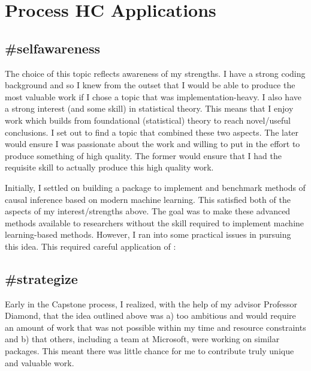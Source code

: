 \documentclass[./main.tex]{subfiles}
\begin{document}

\section{Process HC Applications}
\label{hc:section-process}

\subsection*{\textbf{\#selfawareness}}
\label{hc:selfawareness}

The choice of this topic reflects awareness of my strengths. I have a strong coding background and so I knew from the outset that I would be able to produce the most valuable work if I chose a topic that was implementation-heavy. I also have a strong interest (and some skill) in statistical theory. This means that I enjoy work which builds from foundational (statistical) theory to reach novel/useful conclusions. I set out to find a topic that combined these two aspects. The later would ensure I was passionate about the work and willing to put in the effort to produce something of high quality. The former would ensure that I had the requisite skill to actually produce this high quality work.

\vspace{\baselineskip}

Initially, I settled on building a package to implement and benchmark methods of causal inference based on modern machine learning. This satisfied both of the aspects of my interest/strengths above. The goal was to make these advanced methods available to researchers without the skill required to implement machine learning-based methods. However, I ran into some practical issues in pursuing this idea. This required careful application of :


\subsection*{\textbf{\#strategize}}
\label{hc:strategize}

Early in the Capstone process, I realized, with the help of my advisor Professor Diamond, that the idea outlined above was a) too ambitious and would require an amount of work that was not possible within my time and resource constraints and b) that others, including a team at Microsoft, were working on similar packages. This meant there was little chance for me to contribute truly unique and valuable work.
\end{document}
